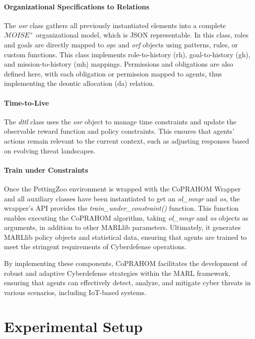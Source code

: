 \documentclass[conference]{IEEEtran}
\newcounter{relation}
\begin{document}
\paragraph{Organizational Specifications to Relations}
The \textit{osr} class gathers all previously instantiated elements into a complete $\mathcal{M}OISE^+$ organizational model, which is JSON representable. In this class, roles and goals are directly mapped to \textit{opc} and \textit{orf} objects using patterns, rules, or custom functions. This class implements role-to-history (rh), goal-to-history (gh), and mission-to-history (mh) mappings. Permissions and obligations are also defined here, with each obligation or permission mapped to agents, thus implementing the deontic allocation (da) relation.

\paragraph{Time-to-Live}
The \textit{dttl} class uses the \textit{osr} object to manage time constraints and update the observable reward function and policy constraints. This ensures that agents' actions remain relevant to the current context, such as adjusting responses based on evolving threat landscapes.

\paragraph{Train under Constraints}
Once the PettingZoo environment is wrapped with the CoPRAHOM Wrapper and all auxiliary classes have been instantiated to get an \textit{ol\_mngr} and \textit{os}, the wrapper's API provides the \textit{train\_under\_constraint()} function. This function enables executing the CoPRAHOM algorithm, taking \textit{ol\_mngr} and \textit{os} objects as arguments, in addition to other MARLlib parameters. Ultimately, it generates MARLlib policy objects and statistical data, ensuring that agents are trained to meet the stringent requirements of Cyberdefense operations.

By implementing these components, CoPRAHOM facilitates the development of robust and adaptive Cyberdefense strategies within the MARL framework, ensuring that agents can effectively detect, analyze, and mitigate cyber threats in various scenarios, including IoT-based systems.


\section{Experimental Setup}\label{sec:experimental_setup}
\end{document}
